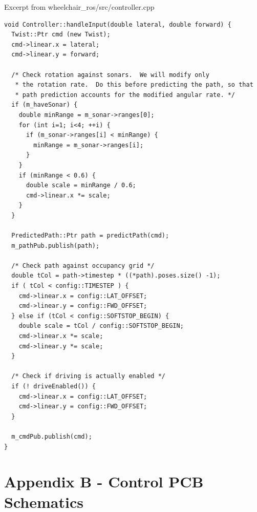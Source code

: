 \documentclass[oneside,final,a4paper]{report}
\begin{document}
Excerpt from wheelchair\_ros/src/controller.cpp
\begin{lstlisting}
void Controller::handleInput(double lateral, double forward) {
  Twist::Ptr cmd (new Twist);
  cmd->linear.x = lateral;
  cmd->linear.y = forward;

  /* Check rotation against sonars.  We will modify only
   * the rotation rate.  Do this before predicting the path, so that
   * path prediction accounts for the modified angular rate. */
  if (m_haveSonar) {
    double minRange = m_sonar->ranges[0];
    for (int i=1; i<4; ++i) {
      if (m_sonar->ranges[i] < minRange) {
        minRange = m_sonar->ranges[i];
      }
    }
    if (minRange < 0.6) {
      double scale = minRange / 0.6;
      cmd->linear.x *= scale;
    }
  }

  PredictedPath::Ptr path = predictPath(cmd);
  m_pathPub.publish(path);

  /* Check path against occupancy grid */
  double tCol = path->timestep * ((*path).poses.size() -1);
  if ( tCol < config::TIMESTEP ) {
    cmd->linear.x = config::LAT_OFFSET;
    cmd->linear.y = config::FWD_OFFSET;
  } else if (tCol < config::SOFTSTOP_BEGIN) {
    double scale = tCol / config::SOFTSTOP_BEGIN;
    cmd->linear.x *= scale;
    cmd->linear.y *= scale;
  } 

  /* Check if driving is actually enabled */
  if (! driveEnabled()) {
    cmd->linear.x = config::LAT_OFFSET;
    cmd->linear.y = config::FWD_OFFSET;
  }

  m_cmdPub.publish(cmd);
}
\end{lstlisting}


\chapter*{Appendix B - Control PCB Schematics}
\end{document}
